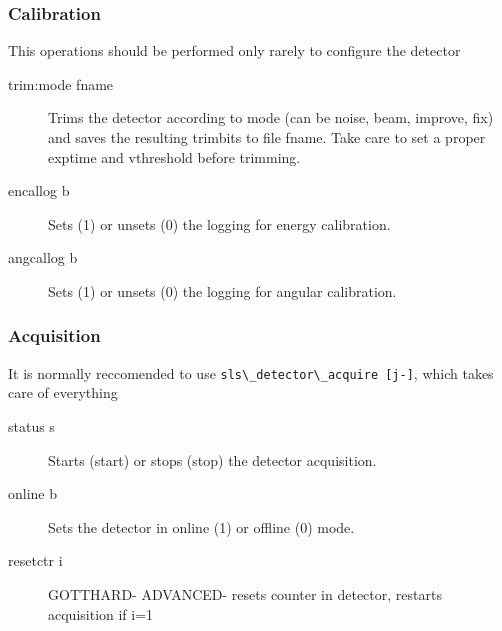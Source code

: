 \documentclass{article}
\begin{document}
\subsubsection{Calibration}
This operations should be performed only rarely to configure the detector

\begin{description}
   \item[trim:mode fname]  Trims the detector according to mode (can be noise, beam, improve, fix) and saves the resulting trimbits to file fname. Take care to set a proper exptime and vthreshold before trimming. 
   \item[encallog b] Sets (1) or unsets (0) the logging for energy calibration.
    \item[angcallog b]       Sets (1) or unsets (0) the logging for angular calibration.
\end{description}




\subsubsection{Acquisition}

It is normally reccomended to use \verb=sls\_detector\_acquire [j-]=, which takes care of everything
\begin{description}
\item[status s] Starts (start) or stops (stop) the detector acquisition.   
\item[online b] Sets the detector in online (1) or offline (0) mode.  
\item[resetctr i] GOTTHARD- ADVANCED- resets counter in detector, restarts acquisition if i=1
\end{description}
\end{document}
